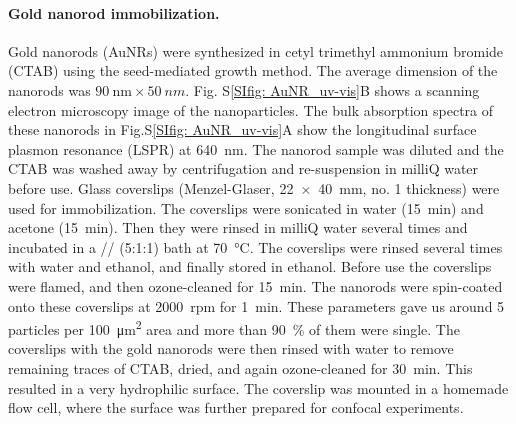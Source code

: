 \paragraph*{Gold nanorod immobilization.}
Gold nanorods (AuNRs) were synthesized in cetyl trimethyl ammonium bromide (CTAB) using the seed-mediated growth method.\cite{nikoobakht2003preparation}
The average dimension of the nanorods was $\SI{90}{\nm} \times \SI{50}{nm}$. Fig. S\ref{SIfig: AuNR_uv-vis}B shows a scanning electron microscopy image of the nanoparticles.
The bulk absorption spectra of these nanorods in Fig.S\ref{SIfig: AuNR_uv-vis}A show the longitudinal surface plasmon resonance (LSPR) 
at \SI{640}{\nm}. The nanorod sample was diluted and the CTAB was washed away by centrifugation and re-suspension in milliQ water before use.
Glass coverslips (Menzel-Glaser, \SI[product-units=repeat]{22x40}{\mm}, no. 1 thickness) were used for immobilization.
The coverslips were sonicated in water (\SI{15}{\minute}) and acetone (\SI{15}{\minute}).
Then they were rinsed in milliQ water several times and incubated in a // (5:1:1) bath at \SI{70}{\celsius}.
The coverslips were rinsed several times with water and ethanol, and finally stored in ethanol.
Before use the coverslips were flamed, and then ozone-cleaned for \SI{15}{\minute}.
The nanorods were spin-coated onto these coverslips at \SI{2000}{rpm} for \SI{1}{\minute}. 
These parameters gave us around 5 particles per \SI{100}{\um\squared} area and more than \SI{90}{\percent} of them were single. 
The coverslips with the gold nanorods were then rinsed with water to remove remaining traces of CTAB, dried, and again ozone-cleaned for \SI{30}{\minute}.
This resulted in a very  hydrophilic surface. The coverslip was mounted in a homemade flow cell, where the surface was further prepared for confocal experiments.

